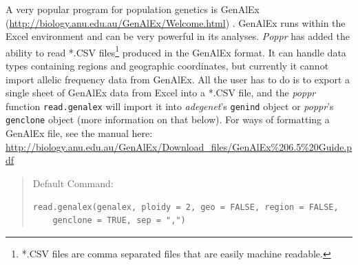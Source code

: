 \documentclass[letterpaper]{article}\usepackage[]{graphicx}\usepackage[]{color}
\makeatletter
\newenvironment{kframe}{%
 \def\at@end@of@kframe{}%
 \ifinner\ifhmode%
  \def\at@end@of@kframe{\end{minipage}}%
  \begin{minipage}{\columnwidth}%
 \fi\fi%
 \def\FrameCommand##1{\hskip\@totalleftmargin \hskip-\fboxsep
 \colorbox{shadecolor}{##1}\hskip-\fboxsep
     \hskip-\linewidth \hskip-\@totalleftmargin \hskip\columnwidth}%
 \MakeFramed {\advance\hsize-\width
   \@totalleftmargin\z@ \linewidth\hsize
   \@setminipage}}%
 {\par\unskip\endMakeFramed%
 \at@end@of@kframe}
\newenvironment{knitrout}{}{} %
\newcommand{\tab}{\hspace*{1em}}
\makeatother
\begin{document}
\tab\tab A very popular program for population genetics is GenAlEx (\url{http://biology.anu.edu.au/GenAlEx/Welcome.html}) \cite{Peakall:2012, Peakall:2006}. GenAlEx runs within the Excel environment and can be very powerful in its analyses. \textit{Poppr} has added the ability to read *.CSV files\footnote{*.CSV files are comma separated files that are easily machine readable.} produced in the GenAlEx format. It can handle data types containing regions and geographic coordinates, but currently it cannot import allelic frequency data from GenAlEx. All the user has to do is to export a single sheet of GenAlEx data from Excel into a *.CSV file, and the \textit{poppr} function \texttt{read.genalex} will import it into \textit{adegenet}'s \texttt{genind} object or \textit{poppr}'s \texttt{genclone} object (more information on that below). For ways of formatting a GenAlEx file, see the manual here: \url{http://biology.anu.edu.au/GenAlEx/Download_files/GenAlEx\%206.5\%20Guide.pdf}
\begin{quote}
Default Command:
\begin{knitrout}
\color{fgcolor}\begin{kframe}
\begin{verbatim}
read.genalex(genalex, ploidy = 2, geo = FALSE, region = FALSE, 
    genclone = TRUE, sep = ",")
\end{verbatim}
\end{kframe}
\end{knitrout}

\end{quote}
\end{document}
